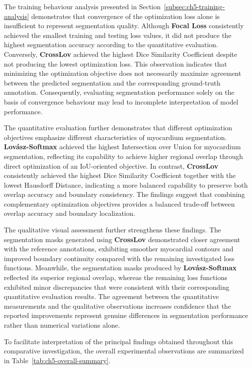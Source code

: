The training behaviour analysis presented in  Section~\ref{subsec:ch5-training-analysis} demonstrates that convergence of the optimization loss alone is insufficient to represent segmentation quality. Although \textbf{Focal Loss} consistently achieved the smallest training and testing loss values, it did not produce the highest segmentation accuracy according to the quantitative evaluation. Conversely, \textbf{CrossLov} achieved the highest Dice Similarity Coefficient despite not producing the lowest optimization loss. This observation indicates that minimizing the optimization objective does not necessarily maximize agreement between the predicted segmentation and the corresponding ground-truth annotation. Consequently, evaluating segmentation performance solely on the basis of convergence behaviour may lead to incomplete interpretation of model performance.

The quantitative evaluation further demonstrates that different optimization objectives emphasize different characteristics of myocardium segmentation. \textbf{Lovász-Softmax} achieved the highest Intersection over Union for myocardium segmentation, reflecting its capability to achieve higher regional overlap through direct optimization of an IoU-oriented objective. In contrast, \textbf{CrossLov} consistently achieved the highest Dice Similarity Coefficient together with the lowest Hausdorff Distance, indicating a more balanced capability to preserve both overlap accuracy and boundary consistency. The findings suggest that combining complementary optimization objectives provides a balanced trade-off between overlap accuracy and boundary localization.

The qualitative visual assessment further strengthens these findings. The segmentation masks generated using \textbf{CrossLov} demonstrated closer agreement with the reference annotations, exhibiting smoother myocardial contours and improved boundary continuity compared with the remaining investigated loss functions. Meanwhile, the segmentation masks produced by \textbf{Lovász-Softmax} reflected its superior regional overlap, whereas the remaining loss functions exhibited minor discrepancies that were consistent with their corresponding quantitative evaluation results. The agreement between the quantitative measurements and the qualitative observations increases confidence that the reported improvements represent genuine differences in segmentation performance rather than numerical variations alone.

To facilitate interpretation of the principal findings obtained throughout this comparative investigation, the overall experimental observations are summarized in Table~\ref{tab:ch5-overall-summary}.


